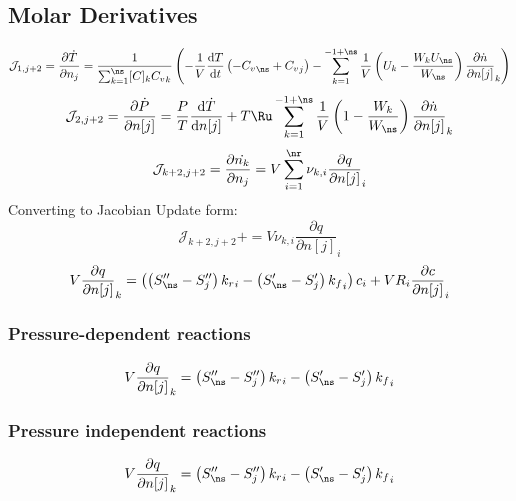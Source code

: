 \documentclass[a4paper,10pt]{article}
\newcommand{\pluseq}{\mathrel{{+}{=}}}
\begin{document}
\subsection{Molar Derivatives}
\begin{dmath} \mathcal{J}_{1,j + 2} = \frac{\partial\dot{T}}{\partial{n_j}} = \frac{1}{\sum_{k=1}^{\ns} [C]_{k} {C_v}_{k}} \left(- \frac{1}{V} \frac{\text{d} T }{\text{d} t } \left(- {C_v}_{\ns} + {C_v}_{j}\right) - \sum_{k=1}^{-1 + \ns} \frac{1}{V} \left(U_{k} - \frac{W_{k} U_{\ns}}{W_{\ns}}\right) \frac{\partial \dot{n} }{\partial n[j] }_{k}\right)\end{dmath} 
\begin{dmath} \mathcal{J}_{2,j + 2} = \frac{\partial \dot{ P } }{\partial n[j] } = \frac{P}{T} \frac{\text{d} \dot{T} }{\text{d} n[j] } + T \Ru \sum_{k=1}^{-1 + \ns} \frac{1}{V} \left(1 - \frac{W_{k}}{W_{\ns}}\right) \frac{\partial \dot{n} }{\partial n[j] }_{k}\end{dmath} 
\begin{dmath} \mathcal{J}_{k + 2,j + 2} = \frac{\partial \dot{n_k} }{\partial n_{j} } = V \sum_{i=1}^{\nr} \nu_{k,i} \frac{\partial q }{\partial n[j] }_{i}\end{dmath} 
Converting to Jacobian Update form:
\begin{dmath} \mathcal{J}_{k + 2,j + 2}\pluseq V \nu_{k,i} \frac{\partial q }{\partial n[j] }_{i}\end{dmath} 
\begin{dmath} V \frac{\partial q }{\partial n[j] }_{k} = \left(\left(S^{\prime\prime}_{\ns} - S^{\prime\prime}_{j}\right) {k_r}_{i} - \left(S^{\prime}_{\ns} - S^{\prime}_{j}\right) {k_f}_{i}\right) c_{i} + V R_{i} \frac{\partial c }{\partial n[j] }_{i}\end{dmath} 
\subsubsection{Pressure-dependent reactions}
\begin{dmath} V \frac{\partial q }{\partial n[j] }_{k} = \left(S^{\prime\prime}_{\ns} - S^{\prime\prime}_{j}\right) {k_r}_{i} - \left(S^{\prime}_{\ns} - S^{\prime}_{j}\right) {k_f}_{i}\end{dmath} 
\subsubsection{Pressure independent reactions}
\begin{dmath} V \frac{\partial q }{\partial n[j] }_{k} = \left(S^{\prime\prime}_{\ns} - S^{\prime\prime}_{j}\right) {k_r}_{i} - \left(S^{\prime}_{\ns} - S^{\prime}_{j}\right) {k_f}_{i}\end{dmath} 
\end{document}

